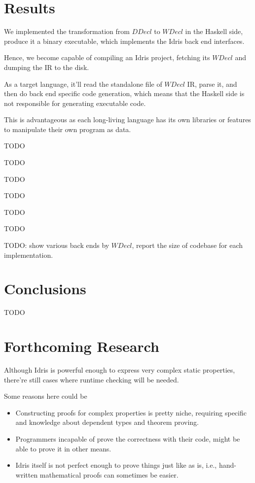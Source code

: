 \documentclass[a1,portrait]{a1poster}
\begin{document}
\begin{multicols}{2}
\section*{Results}

We implemented the transformation from $DDecl$ to $WDecl$ in the Haskell side,
produce it a binary executable, which implements the Idris back end interfaces.

Hence, we become capable of compiling an Idris project, fetching its $WDecl$ and
dumping the IR to the disk.

As a target language, it'll read the standalone file of $WDecl$ IR, parse it,
and then do back end specific code generation, which means that the Haskell side
is not responsible for generating executable code.

This is advantageous as
each long-living language has its own libraries or features to manipulate
their own program as data.

TODO

TODO

TODO

TODO

TODO

TODO

TODO: show various back ends by $WDecl$, report the size of codebase for each implementation.


\section*{Conclusions}

TODO

\color{Black}

\section*{Forthcoming Research}

Although Idris is powerful enough to express very complex static properties,
there're still cases where runtime checking will be needed.

Some reasons here could be

\begin{itemize}
    \setlength\itemsep{-0.2em}
    \item Constructing proofs for complex properties is pretty niche, requiring specific and knowledge about dependent types and theorem proving.
    \item Programmers incapable of prove the correctness with their code, might be able to prove it in other means.
    \item Idris itself is not perfect enough to prove things just like as is, i.e., hand-written mathematical proofs can sometimes be easier.
\end{itemize}


\end{multicols}
\end{document}
